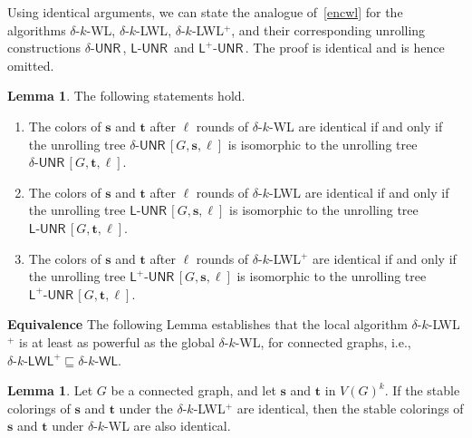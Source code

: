 \documentclass{article}
\newcommand{\xhdr}[1]{{\noindent\bfseries #1}}
\theoremstyle{definition}
\newtheorem{lemma}[theorem]{Lemma}
\renewcommand{\vec}[1]{\mathbf{#1}}
\newcommand{\deltakwl}{$\delta$-$k$-\textsf{WL}\xspace}
\newcommand{\deltakwlm}{\delta\textrm{-}k\textrm{-}\textsf{WL}\xspace}
\newcommand{\localkwl}{$\delta$-$k$-\textsf{LWL}\xspace}
\newcommand{\pluskwl}{$\delta$-$k$-\textsf{LWL}$^+$\xspace}
\newcommand{\pluskwlm}{\delta\textrm{-}k\textrm{-}\textsf{LWL}^+\xspace}
\newcommand{\UNR}{\textsf{UNR}\,}
\newcommand{\deltaunr}{\delta\text{-}\UNR\xspace}
\newcommand{\localunr}{\textsf{L}\text{-}\UNR\xspace}
\newcommand{\plusunr}{\textsf{L}^{\!+}\text{-}\UNR\xspace}
\begin{document}
Using identical arguments, we can state the analogue of~\cref{encwl} for the algorithms \deltakwl, \localkwl, \pluskwl, and their corresponding unrolling constructions $\deltaunr$, $\localunr$ and $\plusunr$. The proof is identical and is hence omitted.

\begin{lemma}\label{enc}
	The following statements hold. 
	\begin{enumerate}
		\item The colors of $\vec{s}$ and $\vec{t}$ after $\ell$ rounds of \deltakwl are identical 
		if and only if the unrolling tree $\deltaunr[G,\vec{s},\ell]$ is isomorphic to the unrolling tree $\deltaunr[G,\vec{t},\ell]$.   
		\item The colors of $\vec{s}$ and $\vec{t}$ after $\ell$ rounds of \localkwl are identical 
		if and only if the unrolling tree $\localunr[G,\vec{s},\ell]$ is isomorphic to the unrolling tree $\localunr[G,\vec{t},\ell]$.   
		\item The colors of $\vec{s}$ and $\vec{t}$ after $\ell$ rounds of \pluskwl are identical 
		if and only if the unrolling tree $\plusunr[G,\vec{s},\ell]$ is isomorphic to the unrolling tree $\plusunr[G,\vec{t},\ell]$.   
	\end{enumerate}
\end{lemma}

\xhdr{Equivalence} The following Lemma establishes that the local algorithm \pluskwl is at least as powerful as the global \deltakwl, for connected graphs, i.e., $\pluskwlm \sqsubseteq \deltakwlm$. 

\begin{lemma}\label{pluseqtodelta}
	Let $G$ be a connected graph, and let $\vec{s}$ and $\vec{t}$ in $V(G)^k$. If the stable colorings of $\vec{s}$ and $\vec{t}$ under the \pluskwl are identical, 
	then the stable colorings of $\vec{s}$ and $\vec{t}$ under \deltakwl are also identical. 
\end{lemma}
\end{document}
